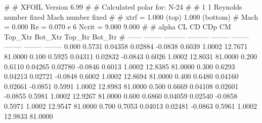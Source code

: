 #  
#       XFOIL         Version 6.99
#  
# Calculated polar for: N-24                                            
#  
# 1 1 Reynolds number fixed          Mach number fixed         
#  
# xtrf =   1.000 (top)        1.000 (bottom)  
# Mach =   0.000     Re =     0.070 e 6     Ncrit =   9.000  9.000
#  
#   alpha    CL        CD       CDp       CM     Top_Xtr  Bot_Xtr  Top_Itr  Bot_Itr
#  ------ -------- --------- --------- -------- -------- -------- -------- --------
   0.000   0.5731   0.04358   0.02884  -0.0838   0.6039   1.0002  12.7671  81.0000
   0.100   0.5925   0.04311   0.02832  -0.0843   0.6026   1.0002  12.8031  81.0000
   0.200   0.6110   0.04265   0.02780  -0.0846   0.6013   1.0002  12.8385  81.0000
   0.300   0.6293   0.04213   0.02721  -0.0848   0.6002   1.0002  12.8694  81.0000
   0.400   0.6480   0.04160   0.02661  -0.0851   0.5991   1.0002  12.8983  81.0000
   0.500   0.6669   0.04108   0.02601  -0.0855   0.5981   1.0002  12.9267  81.0000
   0.600   0.6860   0.04059   0.02540  -0.0858   0.5971   1.0002  12.9547  81.0000
   0.700   0.7053   0.04013   0.02481  -0.0863   0.5961   1.0002  12.9833  81.0000
